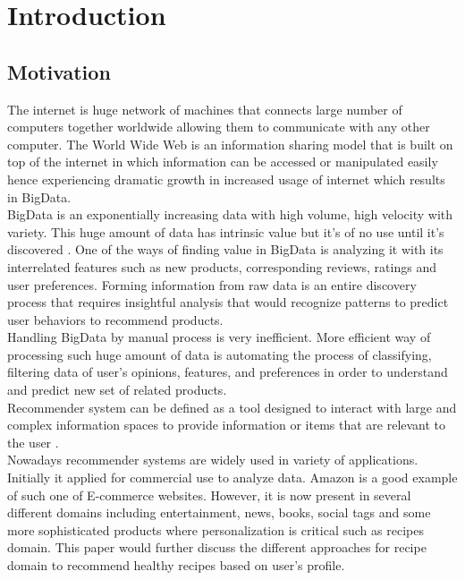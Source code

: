 \chapter{Introduction}
\section{Motivation}
The internet is huge network of machines that connects large number of computers together worldwide allowing them to communicate with any other computer. The World Wide Web is an information sharing model that is built on top of the internet in which information can be accessed or manipulated easily hence experiencing dramatic growth in increased usage of internet which results in BigData. 
\\
BigData is an exponentially increasing data with high volume, high velocity with variety. This huge amount of data has intrinsic value but it’s of no use until it’s discovered \cite{bigdata}. One of the ways of finding value in BigData is analyzing it with its interrelated features such as new products, corresponding reviews, ratings and user preferences. Forming information from raw data is an entire discovery process that requires insightful analysis that would recognize patterns to predict user behaviors to recommend products.
\\
Handling BigData by manual process is very inefficient. More efficient way of processing such huge amount of data is automating the process of classifying, filtering data of user’s opinions, features, and preferences in order to understand and predict new set of related products.
\\ 
Recommender system can be defined as a tool designed to interact with large and complex information spaces to provide information or items that are relevant to the user \cite{recommeder_overview}.
\\
Nowadays recommender systems are widely used in variety of applications. Initially it applied for commercial use to analyze data. Amazon is a good example of such one of E-commerce websites. However, it is now present in several different domains including entertainment, news, books, social tags and some more sophisticated products where personalization is critical such as recipes domain. This paper would further discuss the different approaches for recipe domain to recommend healthy recipes based on user’s profile.


\pagebreak
